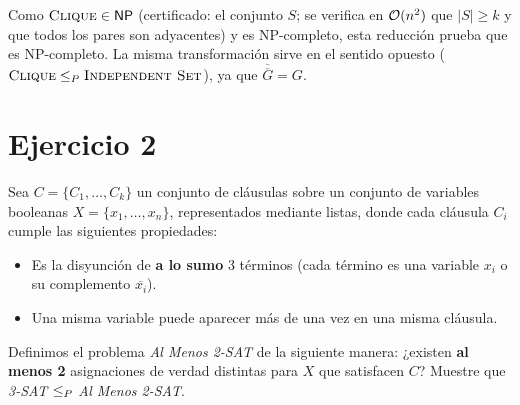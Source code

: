 \begin{center}
\end{center}

\begin{observacion}
Como $\textsc{Clique}\in\mathsf{NP}$ (certificado: el conjunto $S$; se verifica en $\mathcal{O}(n^2)$ que $|S|\ge k$ y que todos los
pares son adyacentes) y \IS{} es NP-completo, esta reducción prueba que \Cl{} es NP-completo. La misma
transformación sirve en el sentido opuesto ($\textsc{Clique}\le_P\textsc{Independent Set}$), ya que $\overline{\overline G}=G$.
\end{observacion}

\section{Ejercicio 2}

\begin{enunciado}
Sea $C=\{C_1,\dots,C_k\}$ un conjunto de cláusulas sobre un conjunto de variables booleanas
$X=\{x_1,\dots,x_n\}$, representados mediante listas, donde cada cláusula $C_i$ cumple las siguientes
propiedades:
\begin{itemize}
  \item Es la disyunción de \textbf{a lo sumo} 3 términos (cada término es una variable $x_i$ o su complemento $\overline{x_i}$).
  \item Una misma variable puede aparecer más de una vez en una misma cláusula.
\end{itemize}
Definimos el problema \emph{Al Menos 2-SAT} de la siguiente manera: ¿existen \textbf{al menos 2}
asignaciones de verdad distintas para $X$ que satisfacen $C$? Muestre que \emph{3-SAT} $\le_P$ \emph{Al Menos 2-SAT}.
\end{enunciado}

